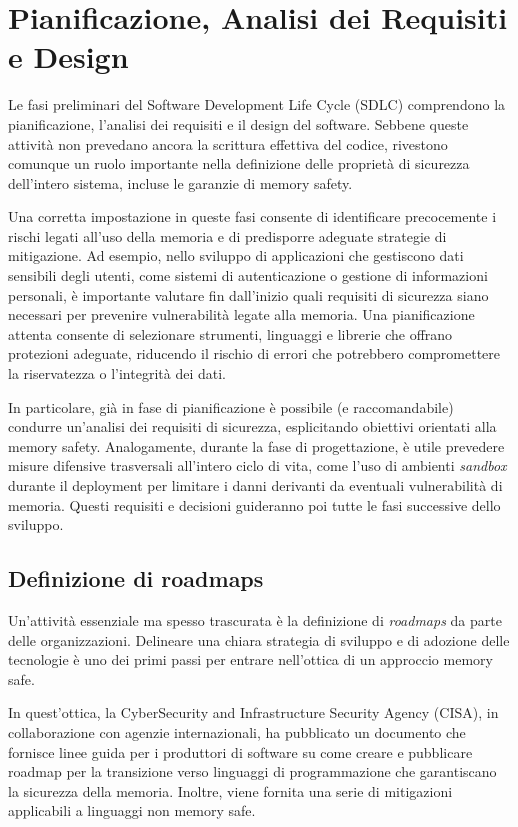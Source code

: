 \section{Pianificazione, Analisi dei Requisiti e Design}
\label{sec:planning_requirements_design}

Le fasi preliminari del Software Development Life Cycle (SDLC) comprendono la pianificazione,
l'analisi dei requisiti e il design del software. Sebbene queste attività non prevedano
ancora la scrittura effettiva del codice, rivestono comunque un ruolo importante
nella definizione delle proprietà di sicurezza dell'intero sistema, incluse le garanzie
di memory safety.

Una corretta impostazione in queste fasi consente di identificare precocemente i
rischi legati all'uso della memoria e di predisporre adeguate strategie di mitigazione.
Ad esempio, nello sviluppo di applicazioni che gestiscono dati sensibili degli utenti,
come sistemi di autenticazione o gestione di informazioni personali, è importante
valutare fin dall'inizio quali requisiti di sicurezza siano necessari per prevenire
vulnerabilità legate alla memoria. Una pianificazione attenta consente di
selezionare strumenti, linguaggi e librerie che offrano protezioni adeguate,
riducendo il rischio di errori che potrebbero compromettere la riservatezza o l'integrità
dei dati.

In particolare, già in fase di pianificazione è possibile (e raccomandabile) condurre
un'analisi dei requisiti di sicurezza, esplicitando obiettivi orientati alla
memory safety. Analogamente, durante la fase di progettazione, è utile prevedere
misure difensive trasversali all'intero ciclo di vita, come l'uso di ambienti
\textit{sandbox} durante il deployment per limitare i danni derivanti da eventuali
vulnerabilità di memoria. Questi requisiti e decisioni guideranno poi tutte le
fasi successive dello sviluppo.

\subsection{Definizione di roadmaps}
\label{sec:roadmap} Un'attività essenziale ma spesso trascurata è la definizione
di \textit{roadmaps} da parte delle organizzazioni. Delineare una chiara
strategia di sviluppo e di adozione delle tecnologie è uno dei primi passi per
entrare nell'ottica di un approccio memory safe.

In quest'ottica, la CyberSecurity and Infrastructure Security Agency (CISA), in
collaborazione con agenzie internazionali, ha pubblicato un documento\cite{memory_safe_roadmaps}
che fornisce linee guida per i produttori di software su come creare e
pubblicare roadmap per la transizione verso linguaggi di programmazione che
garantiscano la sicurezza della memoria. Inoltre, viene fornita una serie di
mitigazioni applicabili a linguaggi non memory safe.


